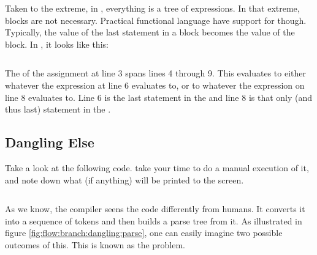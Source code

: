 Taken to the extreme, in , everything is a tree of expressions. In that extreme, blocks are not necessary. Practical functional language have support for  though. Typically, the value of the last statement in a block becomes the value of the block. In , it looks like this:

\inputminted[linenos,firstline=3,firstnumber=1]{elixir}{../src/elixir/flow_branch/ifblock/ifblock.exs}

The  of the assignment at line 3 spans lines 4 through 9. This  evaluates to either whatever the expression at line 6 evaluates to, or to whatever the expression on line 8 evaluates to. Line 6 is the last statement in the  and line 8 is that only (and thus last) statement in the .

\subsection{Dangling Else}
\label{sec:flow:branch:danglingelse}

Take a look at the following code. take your time to do a manual execution of it, and note down what (if anything) will be printed to the screen.

\inputminted[linenos]{csharp}{../src/csharp/flow_branch/dangling/Program.cs}

As we know, the compiler seens the code differently from humans. It converts it into a sequence of tokens and then builds a parse tree from it. As illustrated in figure \ref{fig:flow:branch:dangling:parse}, one can easily imagine two possible outcomes of this. This is known as the  problem.

